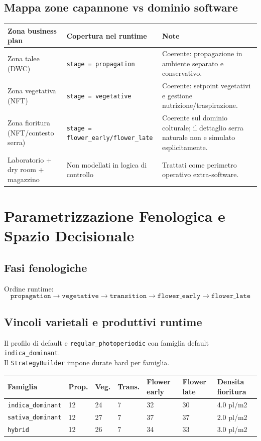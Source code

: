 ﻿\documentclass[11pt,a4paper]{report}
\begin{document}
\section{Mappa zone capannone vs dominio software}
\begin{longtable}{@{}p{4.2cm}p{4.0cm}p{6.8cm}@{}}
\toprule
Zona business plan & Copertura nel runtime & Note \\ \midrule
Zona talee (DWC) & \texttt{stage = propagation} & Coerente: propagazione in ambiente separato e conservativo. \\
Zona vegetativa (NFT) & \texttt{stage = vegetative} & Coerente: setpoint vegetativi e gestione nutrizione/traspirazione. \\
Zona fioritura (NFT/contesto serra) & \texttt{stage = flower\_early/flower\_late} & Coerente sul dominio colturale; il dettaglio serra naturale non e simulato esplicitamente. \\
Laboratorio + dry room + magazzino & Non modellati in logica di controllo & Trattati come perimetro operativo extra-software. \\
\bottomrule
\end{longtable}

\newpage
\chapter{Parametrizzazione Fenologica e Spazio Decisionale}

\section{Fasi fenologiche}
Ordine runtime:
\[
\texttt{propagation} \rightarrow \texttt{vegetative} \rightarrow \texttt{transition} \rightarrow \texttt{flower\_early} \rightarrow \texttt{flower\_late}
\]

\section{Vincoli varietali e produttivi runtime}
Il profilo di default e \texttt{regular\_photoperiodic} con famiglia default \texttt{indica\_dominant}.\\
Il \texttt{StrategyBuilder} impone durate hard per famiglia.

\begin{longtable}{@{}p{3.2cm}p{1.5cm}p{1.5cm}p{1.5cm}p{1.7cm}p{1.5cm}p{2.2cm}@{}}
\toprule
Famiglia & Prop. & Veg. & Trans. & Flower early & Flower late & Densita fioritura \\ \midrule
\texttt{indica\_dominant} & 12 & 24 & 7 & 32 & 30 & 4.0 pl/m2 \\
\texttt{sativa\_dominant} & 12 & 27 & 7 & 37 & 37 & 2.0 pl/m2 \\
\texttt{hybrid} & 12 & 26 & 7 & 34 & 33 & 3.0 pl/m2 \\
\bottomrule
\end{longtable}
\end{document}
